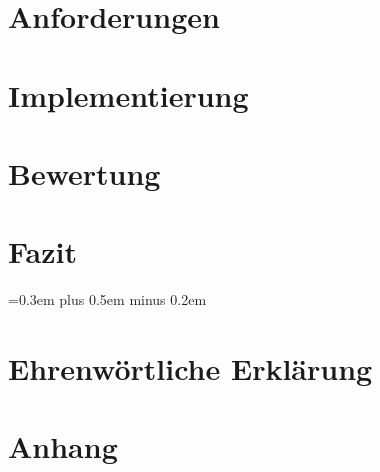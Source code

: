 \documentclass[
	12pt, %
	a4paper,
	bibliography=totoc, %
	numbers=noenddot, %
	ngerman, %
	headsepline, %
	oneside %
	]{scrbook} %
\begin{document}
\chapter{Anforderungen}\label{ch:anforderungen}


\chapter{Implementierung}\label{ch:implementierung}


\chapter{Bewertung}\label{ch:bewertung}


\chapter{Fazit}\label{ch:fazit}


\spaceskip=0.3em plus 0.5em minus 0.2em
\printbibliography


\chapter*{Ehrenwörtliche Erklärung}
\pagestyle{empty}


\appendix
\chapter*{Anhang}

\end{document}
